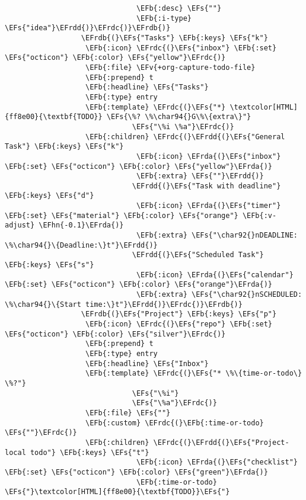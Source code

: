 \documentclass[c]{article}
\theoremstyle{plain}%
\theoremstyle{definition}
\theoremstyle{remark}
\newcommand{\EFs}[1]{\textcolor{EFs}{#1}} %
\newcommand{\EFb}[1]{\textcolor{EFb}{#1}} %
\newcommand{\EFv}[1]{\textcolor{EFv}{#1}} %
\newcommand{\EFhn}[1]{\textcolor{EFhn}{#1}} %
\newcommand{\EFrda}[1]{\textcolor{EFrda}{#1}} %
\newcommand{\EFrdb}[1]{\textcolor{EFrdb}{#1}} %
\newcommand{\EFrdc}[1]{\textcolor{EFrdc}{#1}} %
\newcommand{\EFrdd}[1]{\textcolor{EFrdd}{#1}} %
\begin{document}
\begin{Code}
\begin{Verbatim}
                               \EFb{:desc} \EFs{""}
                               \EFb{:i-type} \EFs{"idea"}\EFrdd{)}\EFrdc{)}\EFrdb{)}
                  \EFrdb{(}\EFs{"Tasks"} \EFb{:keys} \EFs{"k"}
                   \EFb{:icon} \EFrdc{(}\EFs{"inbox"} \EFb{:set} \EFs{"octicon"} \EFb{:color} \EFs{"yellow"}\EFrdc{)}
                   \EFb{:file} \EFv{+org-capture-todo-file}
                   \EFb{:prepend} t
                   \EFb{:headline} \EFs{"Tasks"}
                   \EFb{:type} entry
                   \EFb{:template} \EFrdc{(}\EFs{"*} \textcolor[HTML]{ff8e00}{\textbf{TODO}} \EFs{\%? \%\char94{}G\%\{extra\}"}
                              \EFs{"\%i \%a"}\EFrdc{)}
                   \EFb{:children} \EFrdc{(}\EFrdd{(}\EFs{"General Task"} \EFb{:keys} \EFs{"k"}
                               \EFb{:icon} \EFrda{(}\EFs{"inbox"} \EFb{:set} \EFs{"octicon"} \EFb{:color} \EFs{"yellow"}\EFrda{)}
                               \EFb{:extra} \EFs{""}\EFrdd{)}
                              \EFrdd{(}\EFs{"Task with deadline"} \EFb{:keys} \EFs{"d"}
                               \EFb{:icon} \EFrda{(}\EFs{"timer"} \EFb{:set} \EFs{"material"} \EFb{:color} \EFs{"orange"} \EFb{:v-adjust} \EFhn{-0.1}\EFrda{)}
                               \EFb{:extra} \EFs{"\char92{}nDEADLINE: \%\char94{}\{Deadline:\}t"}\EFrdd{)}
                              \EFrdd{(}\EFs{"Scheduled Task"} \EFb{:keys} \EFs{"s"}
                               \EFb{:icon} \EFrda{(}\EFs{"calendar"} \EFb{:set} \EFs{"octicon"} \EFb{:color} \EFs{"orange"}\EFrda{)}
                               \EFb{:extra} \EFs{"\char92{}nSCHEDULED: \%\char94{}\{Start time:\}t"}\EFrdd{)}\EFrdc{)}\EFrdb{)}
                  \EFrdb{(}\EFs{"Project"} \EFb{:keys} \EFs{"p"}
                   \EFb{:icon} \EFrdc{(}\EFs{"repo"} \EFb{:set} \EFs{"octicon"} \EFb{:color} \EFs{"silver"}\EFrdc{)}
                   \EFb{:prepend} t
                   \EFb{:type} entry
                   \EFb{:headline} \EFs{"Inbox"}
                   \EFb{:template} \EFrdc{(}\EFs{"* \%\{time-or-todo\} \%?"}
                              \EFs{"\%i"}
                              \EFs{"\%a"}\EFrdc{)}
                   \EFb{:file} \EFs{""}
                   \EFb{:custom} \EFrdc{(}\EFb{:time-or-todo} \EFs{""}\EFrdc{)}
                   \EFb{:children} \EFrdc{(}\EFrdd{(}\EFs{"Project-local todo"} \EFb{:keys} \EFs{"t"}
                               \EFb{:icon} \EFrda{(}\EFs{"checklist"} \EFb{:set} \EFs{"octicon"} \EFb{:color} \EFs{"green"}\EFrda{)}
                               \EFb{:time-or-todo} \EFs{"}\textcolor[HTML]{ff8e00}{\textbf{TODO}}\EFs{"}

\end{Verbatim}
\end{Code}
\end{document}
